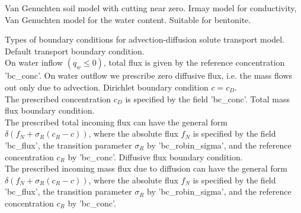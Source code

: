 \begin{SelectionType}
	{}
	{}
		\KeyItem
			{}
			{{{Van Genuchten soil model with cutting near zero.}}}
		\KeyItem
			{}
			{{{Irmay model for conductivity, Van Genuchten model for the water content. Suitable for bentonite.}}}
\end{SelectionType}
\begin{SelectionType}
	{}
	{{{Types of boundary conditions for advection-diffusion solute transport model.}}}
		\KeyItem
			{}
			{{{Default transport boundary condition.}\\{
On water inflow }{$(q_w \le 0)$}{, total flux is given by the reference concentration 'bc{\_}conc'. On water outflow we prescribe zero diffusive flux, i.e. the mass flows out only due to advection.}}}
		\KeyItem
			{}
			{{{Dirichlet boundary condition }{$ c = c_D $}{.}\\{
The prescribed concentration }{$c_D$}{ is specified by the field 'bc{\_}conc'.}}}
		\KeyItem
			{}
			{{{Total mass flux boundary condition.}\\{
The prescribed total incoming flux can have the general form }{$\delta(f_N+\sigma_R(c_R-c) )$}{, where the absolute flux }{$f_N$}{ is specified by the field 'bc{\_}flux', the transition parameter }{$\sigma_R$}{ by 'bc{\_}robin{\_}sigma', and the reference concentration }{$c_R$}{ by 'bc{\_}conc'.}}}
		\KeyItem
			{}
			{{{Diffusive flux boundary condition.}\\{
The prescribed incoming mass flux due to diffusion can have the general form }{$\delta(f_N+\sigma_R(c_R-c) )$}{, where the absolute flux }{$f_N$}{ is specified by the field 'bc{\_}flux', the transition parameter }{$\sigma_R$}{ by 'bc{\_}robin{\_}sigma', and the reference concentration }{$c_R$}{ by 'bc{\_}conc'.}}}
\end{SelectionType}
